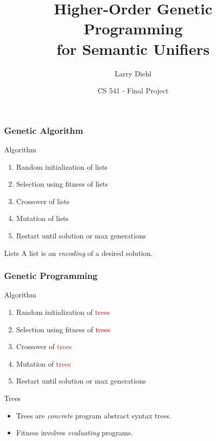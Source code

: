 \documentclass[mathserif]{beamer}
\title{Higher-Order Genetic Programming \\for Semantic Unifiers}
\author{Larry Diehl}
\institute{Portland State University}
\date[Fall 2014]
{CS 541 - Final Project}
\newcommand{\diff}[1]{\textcolor{red}{#1}}
\begin{document}
\frame{\titlepage}

\begin{frame}
\frametitle{Genetic Algorithm}

\begin{block}{Algorithm}
\begin{enumerate}
\item Random initialization of lists
\item Selection using fitness of lists
\item Crossover of lists
\item Mutation of lists
\item Restart until solution or max generations
\end{enumerate}
\end{block}

\begin{block}{Lists}
A list is an \textit{encoding} of a desired solution.
\end{block}

\end{frame}

\begin{frame}
\frametitle{Genetic Programming}

\begin{block}{Algorithm}
\begin{enumerate}
\item Random initialization of \diff{trees}
\item Selection using fitness of \diff{trees}
\item Crossover of \diff{trees}
\item Mutation of \diff{trees}
\item Restart until solution or max generations
\end{enumerate}
\end{block}

\begin{block}{Trees}
\begin{itemize}
\item Trees are \textit{concrete} program abstract syntax trees.
\item Fitness involves \textit{evaluating} programs.
\end{itemize}
\end{block}

\end{frame}

\end{document}
